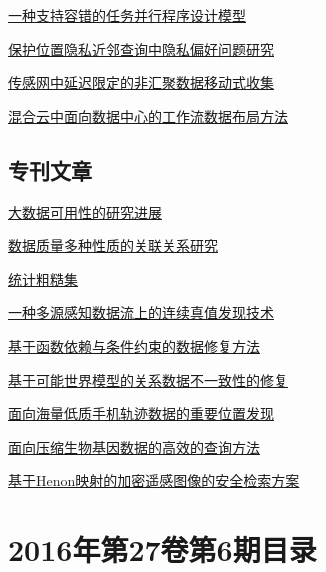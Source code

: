 \documentclass[a4paper]{article}
\begin{document}
\href{http://www.jos.org.cn/ch/reader/download_pdf.aspx?file_no=4842&year_id=2016&quarter_id=7&falg=1}{一种支持容错的任务并行程序设计模型}

\href{http://www.jos.org.cn/ch/reader/download_pdf.aspx?file_no=5053&year_id=2016&quarter_id=7&falg=1}{保护位置隐私近邻查询中隐私偏好问题研究}

\href{http://www.jos.org.cn/ch/reader/download_pdf.aspx?file_no=4926&year_id=2016&quarter_id=7&falg=1}{传感网中延迟限定的非汇聚数据移动式收集}

\href{http://www.jos.org.cn/ch/reader/download_pdf.aspx?file_no=4879&year_id=2016&quarter_id=7&falg=1}{混合云中面向数据中心的工作流数据布局方法}

\subsection{专刊文章}
\href{http://www.jos.org.cn/ch/reader/download_pdf.aspx?file_no=5038&year_id=2016&quarter_id=7&falg=1}{大数据可用性的研究进展}

\href{http://www.jos.org.cn/ch/reader/download_pdf.aspx?file_no=5040&year_id=2016&quarter_id=7&falg=1}{数据质量多种性质的关联关系研究}

\href{http://www.jos.org.cn/ch/reader/download_pdf.aspx?file_no=5036&year_id=2016&quarter_id=7&falg=1}{统计粗糙集}

\href{http://www.jos.org.cn/ch/reader/download_pdf.aspx?file_no=5033&year_id=2016&quarter_id=7&falg=1}{一种多源感知数据流上的连续真值发现技术}

\href{http://www.jos.org.cn/ch/reader/download_pdf.aspx?file_no=5037&year_id=2016&quarter_id=7&falg=1}{基于函数依赖与条件约束的数据修复方法}

\href{http://www.jos.org.cn/ch/reader/download_pdf.aspx?file_no=5041&year_id=2016&quarter_id=7&falg=1}{基于可能世界模型的关系数据不一致性的修复}

\href{http://www.jos.org.cn/ch/reader/download_pdf.aspx?file_no=5035&year_id=2016&quarter_id=7&falg=1}{面向海量低质手机轨迹数据的重要位置发现}

\href{http://www.jos.org.cn/ch/reader/download_pdf.aspx?file_no=5034&year_id=2016&quarter_id=7&falg=1}{面向压缩生物基因数据的高效的查询方法}

\href{http://www.jos.org.cn/ch/reader/download_pdf.aspx?file_no=5039&year_id=2016&quarter_id=7&falg=1}{基于Henon映射的加密遥感图像的安全检索方案}


\section{\textbf{2016年第27卷第6期目录}}
\end{document}
